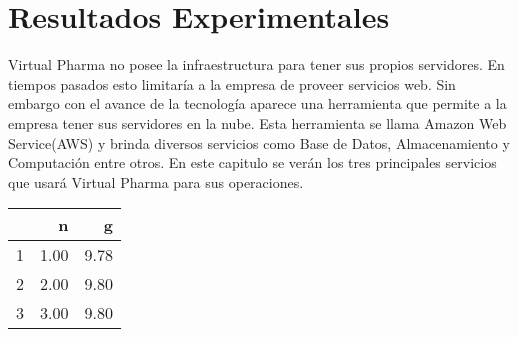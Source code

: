 \section*{Resultados Experimentales}\label{sec:Resultados Experimentales}
Virtual Pharma no posee la infraestructura para tener sus propios servidores. En tiempos pasados esto limitaría a la empresa de proveer servicios web. Sin embargo con el avance de la tecnología aparece una herramienta que permite a la empresa tener sus servidores en la nube. Esta herramienta se llama Amazon Web Service(AWS) y brinda diversos servicios como Base de Datos, Almacenamiento y Computación entre otros. En este capitulo se verán los tres principales servicios que usará Virtual Pharma para sus operaciones.
\begin{table}[ht]
\centering
\begin{tabular}{rrr}
  \hline
 & n & g \\ 
  \hline
1 & 1.00 & 9.78 \\ 
  2 & 2.00 & 9.80 \\ 
  3 & 3.00 & 9.80 \\ 
   \hline
\end{tabular}
\end{table}